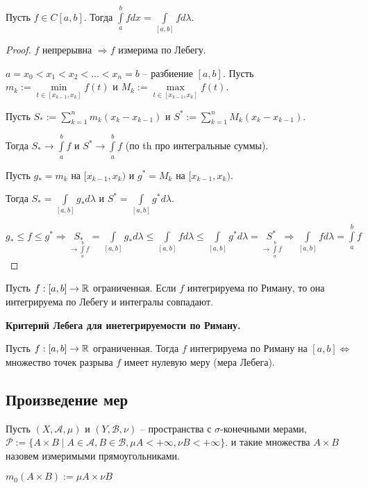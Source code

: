 \begin{theorem}
    Пусть $f\in C[a, b]$. Тогда $\int\limits_a^b f dx = \int\limits_{[a,b]} fd\lambda$.
\end{theorem}

\begin{proof}
    $f$ непрерывна $\Rightarrow f$ измерима по Лебегу.

    $a=x_0< x_1 < x_2 < ... < x_n = b$ –  разбиение $[a, b]$. Пусть $m_k := \underset{t\in [x_{k-1}, x_k]}{\min} f(t)$
    и $M_k := \underset{t\in [x_{k-1}, x_k]}{\max} f(t)$.

    Пусть $S_*:=\sum\limits_{k=1}^n m_k (x_k - x_{k-1})$ и $S^*:=\sum\limits_{k=1}^n M_k (x_k - x_{k-1})$.

    Тогда $S_*\rightarrow \int\limits_a^b f$ и $S^*\rightarrow \int\limits_a^b f$ (по th про интегральные суммы).
    
    Пусть $g_* = m_k$ на $[x_{k-1}, x_k)$ и $g^* = M_k$ на $[x_{k-1}, x_k)$.

    Тогда $S_* = \int\limits_{[a,b]} g_* d\lambda$ и  $S^* = \int\limits_{[a,b]} g^* d\lambda$.

    $g_*\leq f \leq g^*\Rightarrow \underset{\rightarrow \int\limits_a^b f}{S_*} =\int\limits_{[a,b]} g_* d\lambda\leq \int\limits_{[a,b]} f d\lambda
    \leq \int\limits_{[a,b]} g^* d\lambda= \underset{\rightarrow \int\limits_a^b f}{S^*}\Rightarrow \int\limits_{[a,b]} f d\lambda = \int\limits_a^b f$
\end{proof}

\begin{theorem}
    Пусть $f:[a, b]\rightarrow \mathbb{R}$ ограниченная. Если $f$ интегрируема по Риману, то она интегрируема по Лебегу и 
    интегралы совпадают.
\end{theorem}

\begin{theorem}
    \textbf{Критерий Лебега для инетегрируемости по Риману.}

    Пусть $f:[a, b]\rightarrow \mathbb{R}$ ограниченная. Тогда $f$ интегрируема по Риману на $[a, b]\Leftrightarrow$
    множество точек разрыва $f$ имеет нулевую меру (мера Лебега).
\end{theorem}

\subsection{Произведение мер}

\begin{definition}
    Пусть $(X, \mathcal{A}, \mu)$ и $(Y, \mathcal{B}, \nu)$ – пространства с $\sigma$-конечными мерами, 
    $\mathcal{P}:=\{A\times B\mid A\in \mathcal{A}, B\in \mathcal{B}, \mu A <+\infty, \nu B <+\infty\}$.
    и такие множества $A\times B$ назовем измеримыми прямоугольниками.

    $m_0(A\times B):= \mu A\times \nu B$
\end{definition}


